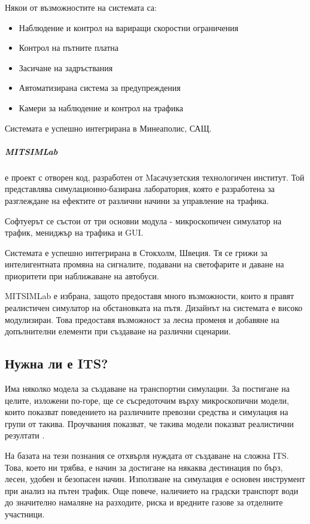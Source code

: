 	  	Някои от възможностите на системата са:
	  	\begin{itemize}
	  		\item Наблюдение и контрол на вариращи скоростни ограничения
	  		\item Контрол на пътните платна
	  		\item Засичане на задръствания
	  		\item Автоматизирана система за предупреждения
	  		\item Камери за наблюдение и контрол на трафика	  		
	  	\end{itemize}
	  	
	  	Системата е успешно интегрирана в Минеаполис, САЩ.
	  		  	
	  	\subparagraph{\emph{MITSIMLab}} е проект с отворен код, разработен от Mасачузетския технологичен институт.
	  	Той представлява симулационно-базирана лаборатория, която е разработена за разглеждане на ефектите 
	  	от различни начини за управление на трафика.
	  	
	  	Софтуерът се състои от три основни модула - микроскопичен симулатор на трафик, мениджър на трафика
	  	и \ac{GUI}.
	  	
	  	Системата е успешно интегрирана в Стокхолм, Швеция. Тя се грижи за интелигентната промяна
	  	на сигналите, подавани на светофарите и даване на приоритети при наближаване на автобуси.
	  	
	  	MITSIMLab е избрана, защото предоставя много възможности, които я правят реалистичен
	  	симулатор на обстановката на пътя. Дизайнът на системата е високо модулизиран. Това
	  	предоставя възможност за лесна променя и добавяне на допълнителни елементи при създаване
	  	на различни сценарии. \cite{Rehunathan}
	  
	\subsection{Нужна ли е \ac{ITS}?}
	
		Има няколко модела за създаване на транспортни симулации. За постигане на целите, изложени по-горе,
		ще се съсредоточим върху микроскопични модели, които показват поведението на различните превозни
		средства и симулация на групи от такива. Проучвания показват, че такива модели показват
		реалистични резултати \cite{Nagel}.
		
		На базата на тези познания се отхвърля нуждата от създаване на сложна \ac{ITS}. Това, което
		ни трябва, е начин за достигане на някаква дестинация по бърз, лесен, удобен и безопасен начин.
		Използване на симулация е основен инструмент при анализ на пътен трафик. Още повече, наличието
		на градски транспорт води до значително намаляне на разходите, риска и вредните газове за отделните участници.

